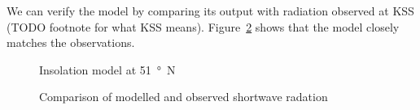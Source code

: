 \documentclass[a4paper,titlepage]{article}
\begin{document}
We can verify the model by comparing its output with radiation observed at KSS (TODO footnote for what KSS means).  Figure~\ref{fig:toa-model-verification} shows that the model closely matches the observations.

\begin{figure}
\centering

\caption{Insolation model at \SI{51}{\degree N}}
\label{fig:toa-model}
\end{figure}

\begin{figure}
\centering

\caption{Comparison of modelled and observed shortwave radation}
\label{fig:toa-model-verification}
\end{figure}
\end{document}
